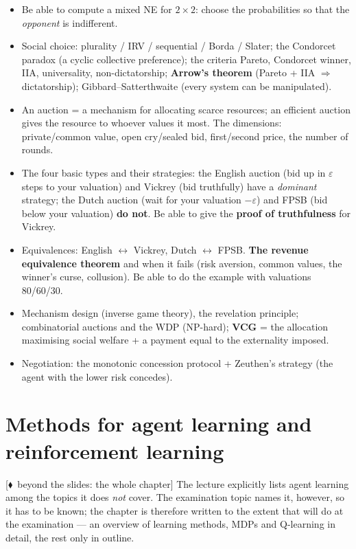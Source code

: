 \documentclass[11pt,a4paper]{article}
\theoremstyle{definition}
\newcommand{\mimoq}[1]{\textcolor{markcol}{\textsf{\footnotesize[$\blacklozenge$~beyond the slides: #1]}}}
\begin{document}
\begin{itemize}
\item Be able to compute a mixed NE for $2\times2$: choose the probabilities so that the
  \emph{opponent} is indifferent.
\item Social choice: plurality / IRV / sequential / Borda / Slater; the Condorcet paradox
  (a cyclic collective preference); the criteria Pareto, Condorcet winner, IIA, universality,
  non-dictatorship; \textbf{Arrow's theorem} (Pareto + IIA $\Rightarrow$ dictatorship);
  Gibbard--Satterthwaite (every system can be manipulated).
\item An auction = a mechanism for allocating scarce resources; an efficient auction gives the
  resource to whoever values it most. The dimensions: private/common value, open cry/sealed bid,
  first/second price, the number of rounds.
\item The four basic types and their strategies: the English auction (bid up in $\varepsilon$
  steps to your valuation) and Vickrey (bid truthfully) have a \emph{dominant} strategy;
  the Dutch auction (wait for your valuation $-\varepsilon$) and FPSB (bid below your valuation)
  \textbf{do not}. Be able to give the \textbf{proof of truthfulness} for Vickrey.
\item Equivalences: English $\leftrightarrow$ Vickrey, Dutch $\leftrightarrow$ FPSB.
  \textbf{The revenue equivalence theorem} and when it fails (risk aversion, common values, the
  winner's curse, collusion). Be able to do the example with valuations 80/60/30.
\item Mechanism design (inverse game theory), the revelation principle; combinatorial auctions
  and the WDP (NP-hard); \textbf{VCG} = the allocation maximising social welfare + a payment
  equal to the externality imposed.
\item Negotiation: the monotonic concession protocol + Zeuthen's strategy (the agent with the
  lower risk concedes).
\end{itemize}

\section{Methods for agent learning and reinforcement learning}
\label{sec:uceni}

\noindent\mimoq{the whole chapter} The lecture explicitly lists agent learning among the topics
it does \emph{not} cover. The examination topic names it, however, so it has to be known; the
chapter is therefore written to the extent that will do at the examination --- an overview of
learning methods, MDPs and Q-learning in detail, the rest only in outline.
\end{document}
